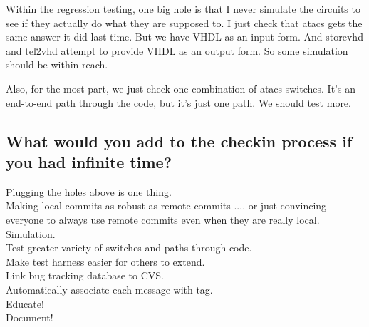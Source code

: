 \documentclass[titlepage,11pt]{article}
\begin{document}
  Within the regression testing, one big hole is that I never simulate
  the circuits to see if they actually do what they are supposed to.  I
  just check that atacs gets the same answer it did last time.  But we
  have VHDL as an input form.  And storevhd and tel2vhd attempt to
  provide VHDL as an output form.  So some simulation should be within
  reach.
  
  Also, for the most part, we just check one combination of atacs
  switches.  It's an end-to-end path through the code, but it's just one
  path.  We should test more.
  
  \subsection{What would you add to the checkin process if you had
    infinite time?}
  
  Plugging the holes above is one thing.\\
  Making local commits as robust as remote commits .... or just
  convincing everyone to always use remote commits even when they are
  really local.
  Simulation.\\
  Test greater variety of switches and paths through code.\\
  Make test harness easier for others to extend.\\
  Link bug tracking database to CVS.\\
  Automatically associate each message with tag.\\
  Educate!\\
  Document!
  
\end{document}
